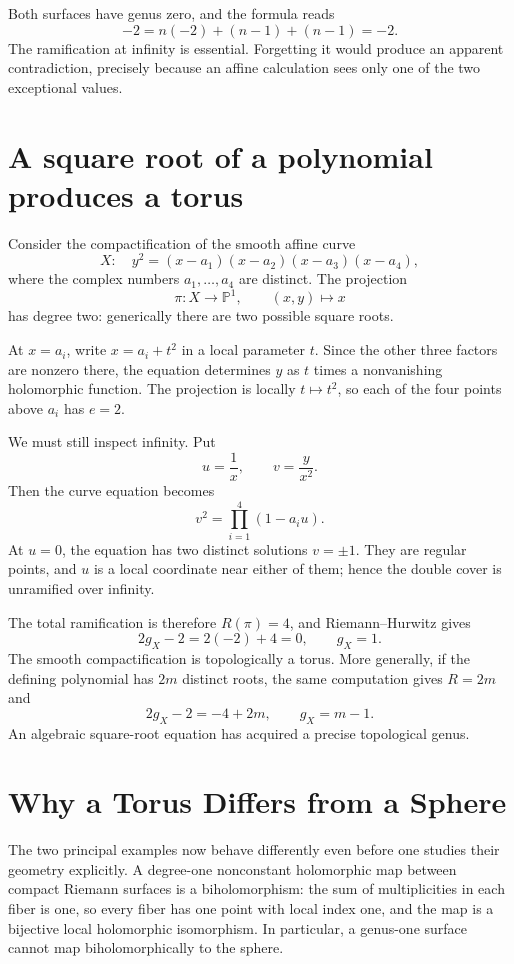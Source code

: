Both surfaces have genus zero, and the formula reads
\[
 -2=n(-2)+(n-1)+(n-1)=-2.
\]
The ramification at infinity is essential. Forgetting it would produce an apparent contradiction, precisely because an affine calculation sees only one of the two exceptional values.

\section{A square root of a polynomial produces a torus}

Consider the compactification of the smooth affine curve
\[
 X:\quad y^2=(x-a_1)(x-a_2)(x-a_3)(x-a_4),
\]
where the complex numbers \(a_1,\ldots,a_4\) are distinct. The projection
\[
 \pi:X\longrightarrow\mathbb P^1,\qquad(x,y)\longmapsto x
\]
has degree two: generically there are two possible square roots.

At \(x=a_i\), write \(x=a_i+t^2\) in a local parameter \(t\). Since the other three factors are nonzero there, the equation determines \(y\) as \(t\) times a nonvanishing holomorphic function. The projection is locally \(t\mapsto t^2\), so each of the four points above \(a_i\) has \(e=2\).

We must still inspect infinity. Put
\[
 u=\frac1x,\qquad v=\frac{y}{x^2}.
\]
Then the curve equation becomes
\[
 v^2=\prod_{i=1}^{4}(1-a_i u).
\]
At \(u=0\), the equation has two distinct solutions \(v=\pm1\). They are regular points, and \(u\) is a local coordinate near either of them; hence the double cover is unramified over infinity.

The total ramification is therefore \(R(\pi)=4\), and Riemann--Hurwitz gives
\[
 2g_X-2=2(-2)+4=0,
 \qquad\boxed{g_X=1.}
\]
The smooth compactification is topologically a torus. More generally, if the defining polynomial has \(2m\) distinct roots, the same computation gives \(R=2m\) and
\[
 2g_X-2=-4+2m,\qquad g_X=m-1.
\]
An algebraic square-root equation has acquired a precise topological genus.

\section{Why a Torus Differs from a Sphere}

The two principal examples now behave differently even before one studies their geometry explicitly. A degree-one nonconstant holomorphic map between compact Riemann surfaces is a biholomorphism: the sum of multiplicities in each fiber is one, so every fiber has one point with local index one, and the map is a bijective local holomorphic isomorphism. In particular, a genus-one surface cannot map biholomorphically to the sphere.

